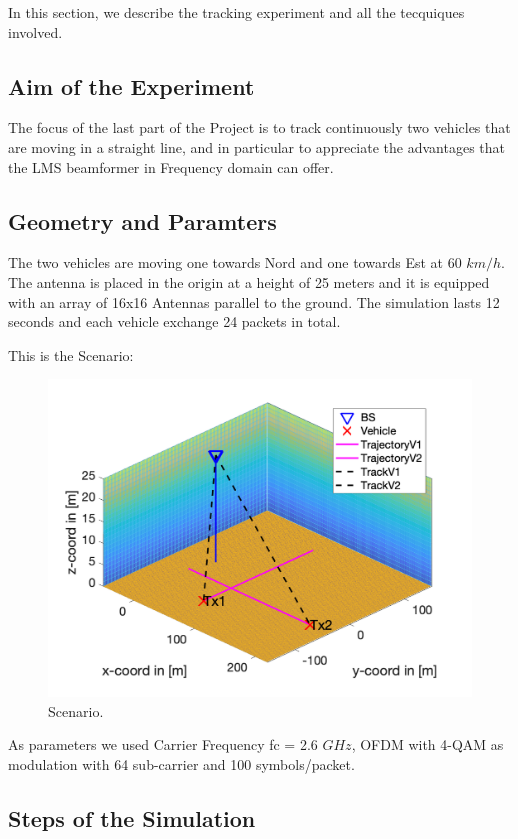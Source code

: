 In this section, we describe the tracking experiment and all the tecquiques involved.

\subsection{Aim of the Experiment}

The focus of the last part of the Project is to track continuously two vehicles that are moving in a straight line,
and in particular to appreciate the advantages that the LMS beamformer in Frequency domain can offer.

\subsection{Geometry and Paramters}
The two vehicles are moving one towards Nord and one towards Est at 60 $km/h$. The antenna is placed in the origin at a height of 25 meters
and it is equipped with an array of 16x16 Antennas parallel to the ground. The simulation lasts 12 seconds and each vehicle 
exchange 24 packets in total.

This is the Scenario:

\begin{figure}[ht]
\includegraphics[width=\linewidth]{Quadriga1.png}
  \caption{Scenario.}
  \label{fig:Scenario}
\end{figure}

As parameters we used Carrier Frequency fc = 2.6 $GHz$, OFDM with 4-QAM as modulation with 64 sub-carrier and 100 symbols/packet.

\subsection{Steps of the Simulation}

